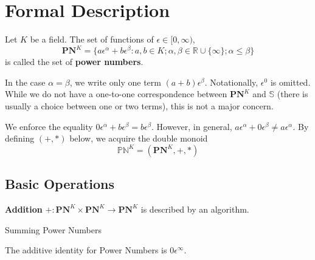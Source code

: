 \documentclass[acmsmall]{acmart}
\begin{document}
\section{Formal Description}

\begin{definition}
Let $K$ be a field. The set of functions of $\epsilon \in [0,\infty)$,
$$\mathbf{PN}^K = \{a\epsilon^\alpha + b\epsilon^\beta : a,b \in K;\alpha,\beta\in\mathbb{R}\cup\{\infty\}; \alpha\leq\beta\}$$ 
is called the set of \textbf{power numbers}. 
\end{definition}



In the case $\alpha=\beta$, we write only one term $(a+b)\epsilon^\beta$. Notationally, $\epsilon^0$ is omitted. While we do not have a one-to-one correspondence between $\mathbf{PN}^K$ and $\mathbb{S}$ (there is usually a choice between one or two terms), this is not a major concern.

We enforce the equality $0\epsilon^\alpha + b\epsilon^\beta = b\epsilon^\beta$. However, in general, $a\epsilon^\alpha + 0\epsilon^\beta \neq a\epsilon^\alpha$.
By defining $(+,*)$ below, we acquire the double monoid $$\mathbb{PN}^K = (\mathbf{PN}^K,+,*)$$

\subsection{Basic Operations}
\begin{definition}
\textbf{Addition} $+:\mathbf{PN}^K \times \mathbf{PN}^K \rightarrow \mathbf{PN}^K$ is described by an algorithm.

\begin{algorithm}[H]
	\SetAlgoLined
	
	\caption{Summing Power Numbers}	
\end{algorithm}

The additive identity for Power Numbers is $0\epsilon^\infty$.
\end{definition}
\end{document}
